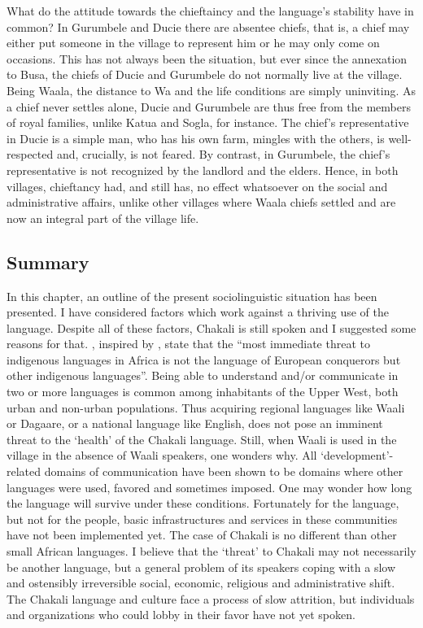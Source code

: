 What do the attitude towards the chieftaincy and the language's stability have
in common?  In Gurumbele and Ducie there are  absentee
chiefs, that is, a chief may either put someone in the village to represent him
or he may only come on occasions. This has not always been the
situation,
but ever since the annexation to Busa, the chiefs of Ducie and Gurumbele
 do not normally live at the village. Being Waala, the distance to Wa and the
life conditions are simply uninviting. As a chief never settles alone, Ducie and
Gurumbele are thus free from the members of royal families, unlike   Katua and
Sogla, for instance. The chief's representative in Ducie
is a simple man, who has his own farm, mingles with the others, is
well-respected
and, crucially, is not feared. By contrast, in Gurumbele, the chief's
representative is not recognized by the landlord and the elders. Hence, in both
villages, chieftancy had, and still has, no effect whatsoever on the social and
administrative affairs, unlike other villages where Waala chiefs settled and are
now an integral part of the village life. 


\subsection{Summary}
\label{sec:SOC-summary}


In this chapter,  an outline of the present sociolinguistic situation has been
presented.  I have considered factors  which work against a
thriving  use of the
language. Despite all of these factors, Chakali is still spoken and I
suggested some reasons for that.  \citet[42]{Gren98}, inspired by
\cite{Bren91}, state
that the ``most immediate threat to indigenous languages in Africa is not the
language of European conquerors but other indigenous languages''.   Being able
to understand and/or communicate in two or more languages is common among
inhabitants of the Upper West,    both urban and non-urban populations.
Thus acquiring  regional languages like  Waali or Dagaare, or a national
language like English, does not pose an imminent threat to the `health' of the
Chakali language. Still, when Waali is used in the village in the absence of
Waali speakers, one wonders why. All `development'-related domains
of communication have been shown to be domains where other languages
were used, favored and
sometimes imposed.  One may wonder how long the language will survive under
these conditions.  Fortunately for the language, but not for the people, basic
infrastructures and  services in these communities have not been implemented 
yet. The case of Chakali is no different than other small African
languages. I believe that the `threat' to Chakali may not necessarily be
another language, but a general problem of its speakers coping  with a slow and
ostensibly irreversible social, economic, religious and administrative shift.
The Chakali language and culture face a process of slow attrition,  but
individuals and organizations who could lobby in their favor  have not yet
spoken. 
 